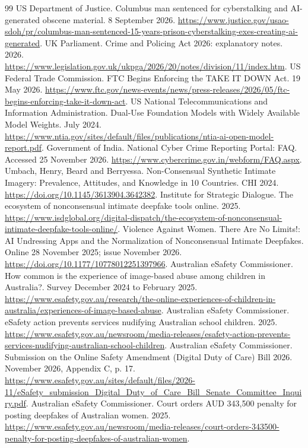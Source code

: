 \documentclass[10pt,a4paper]{article}
\begin{document}
\begin{thebibliography}{99}
 US Department of Justice. Columbus man sentenced for cyberstalking and AI-generated obscene material. 8 September 2026. \url{https://www.justice.gov/usao-sdoh/pr/columbus-man-sentenced-15-years-prison-cyberstalking-exes-creating-ai-generated}.
 UK Parliament. Crime and Policing Act 2026: explanatory notes. 2026. \url{https://www.legislation.gov.uk/ukpga/2026/20/notes/division/11/index.htm}.
 US Federal Trade Commission. FTC Begins Enforcing the TAKE IT DOWN Act. 19 May 2026. \url{https://www.ftc.gov/news-events/news/press-releases/2026/05/ftc-begins-enforcing-take-it-down-act}.
 US National Telecommunications and Information Administration. Dual-Use Foundation Models with Widely Available Model Weights. July 2024. \url{https://www.ntia.gov/sites/default/files/publications/ntia-ai-open-model-report.pdf}.
 Government of India. National Cyber Crime Reporting Portal: FAQ. Accessed 25 November 2026. \url{https://www.cybercrime.gov.in/webform/FAQ.aspx}.
 Umbach, Henry, Beard and Berryessa. Non-Consensual Synthetic Intimate Imagery: Prevalence, Attitudes, and Knowledge in 10 Countries. CHI 2024. \url{https://doi.org/10.1145/3613904.3642382}.
 Institute for Strategic Dialogue. The ecosystem of nonconsensual intimate deepfake tools online. 2025. \url{https://www.isdglobal.org/digital-dispatch/the-ecosystem-of-nonconsensual-intimate-deepfake-tools-online/}.
 Violence Against Women. There Are No Limits!: AI Undressing Apps and the Normalization of Nonconsensual Intimate Deepfakes. Online 28 November 2025; issue November 2026. \url{https://doi.org/10.1177/10778012251397966}.
 Australian eSafety Commissioner. How common is the experience of image-based abuse among children in Australia?. Survey December 2024 to February 2025. \url{https://www.esafety.gov.au/research/the-online-experiences-of-children-in-australia/experiences-of-image-based-abuse}.
 Australian eSafety Commissioner. eSafety action prevents services nudifying Australian school children. 2025. \url{https://www.esafety.gov.au/newsroom/media-releases/esafety-action-prevents-services-nudifying-australian-school-children}.
 Australian eSafety Commissioner. Submission on the Online Safety Amendment (Digital Duty of Care) Bill 2026. November 2026, Appendix C, p. 17. \url{https://www.esafety.gov.au/sites/default/files/2026-11/eSafety_submission_Digital_Duty_of_Care_Bill_Senate_Committee_Inquiry.pdf}.
 Australian eSafety Commissioner. Court orders AUD 343,500 penalty for posting deepfakes of Australian women. 2025. \url{https://www.esafety.gov.au/newsroom/media-releases/court-orders-343500-penalty-for-posting-deepfakes-of-australian-women}.

\end{thebibliography}
\end{document}
